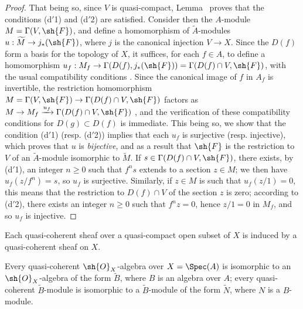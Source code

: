 \begin{proof}
That being so, since $V$ is quasi-compact, Lemma~ proves that
the conditions (d$'$1) and (d$'$2) are satisfied.
Consider then the $A$-module $M=\Gamma(V,\sh{F})$, and define a homomorphism of $\widetilde{A}$-modules $u:\widetilde{M}\to j_*(\sh{F})$, where $j$ is the canonical injection $V\to X$.
Since the $D(f)$ form a basis for the topology of $X$, it suffices, for each $f\in A$, to define a homomorphism $u_f:M_f\to\Gamma(D(f),j_*(\sh{F}))=\Gamma(D(f)\cap V,\sh{F})$, with the usual compatibility conditions .
Since the canonical image of $f$ in $A_f$ is invertible, the restriction homomorphism $M=\Gamma(V,\sh{F})\to\Gamma(D(f)\cap V,\sh{F})$ factors as $M\to M_f\xrightarrow{u_f}\Gamma(D(f)\cap V,\sh{F})$ , and the verification of these compatibility conditions for $D(g)\subset D(f)$ is immediate.
This being so, we show that the condition (d$'$1) (resp. (d$'$2)) implies that each $u_f$ is surjective (resp. injective), which proves that $u$ is \emph{bijective}, and as a result that $\sh{F}$ is the restriction to $V$ of an $\widetilde{A}$-module isomorphic to $\widetilde{M}$.
If $s\in\Gamma(D(f)\cap V,\sh{F})$, there exists, by (d$'$1), an integer $n\geq 0$ such that $f^n s$ extends to a section $z\in M$;
we then have $u_f(z/f^n)=s$, so $u_f$ is surjective.
Similarly, if $z\in M$ is such that $u_f(z/1)=0$, this means that the restriction to $D(f)\cap V$ of the section $z$ is zero;
according to (d$'$2), there exists an integer $n\geq 0$ such that $f^n z=0$, hence $z/1=0$ in $M_f$, and so $u_f$ is injective.
\end{proof}

\begin{corollary}[1.4.2]
\label{I.1.4.2}
Each quasi-coherent sheaf over a quasi-compact open subset of $X$ is induced by a quasi-coherent sheaf on $X$.
\end{corollary}

\begin{corollary}[1.4.3]
\label{I.1.4.3}
Every quasi-coherent $\sh{O}_X$-algebra over $X=\Spec(A)$ is isomorphic to an $\sh{O}_X$-algebra of the form $\widetilde{B}$, where $B$ is an algebra over $A$;
every quasi-coherent $\widetilde{B}$-module is isomorphic to a $\widetilde{B}$-module of the form $\widetilde{N}$, where $N$ is a $B$-module.
\end{corollary}


